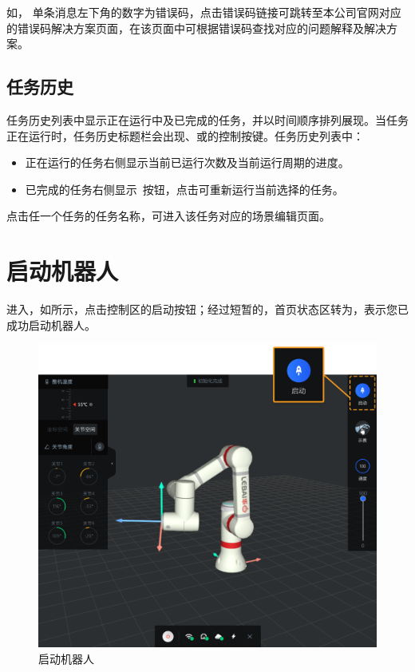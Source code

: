 如，
单条消息左下角的数字为错误码，点击错误码链接可跳转至本公司官网对应的错误码解决方案页面，在该页面中可根据错误码查找对应的问题解释及解决方案。

\subsection{任务历史}
\label{sec:任务历史}
任务历史列表中显示正在运行中及已完成的任务，并以时间顺序排列展现。当任务正在运行时，任务历史标题栏会出现、或的控制按键。任务历史列表中：
\begin{itemize}
	\item 正在运行的任务右侧显示当前已运行次数及当前运行周期的进度。
	\item 已完成的任务右侧显示~按钮，点击可重新运行当前选择的任务。
\end{itemize}

点击任一个任务的任务名称，可进入该任务对应的场景编辑页面。


\clearpage

\section{启动机器人}
进入\LM ，如所示，点击控制区的启动按钮；经过短暂的，首页状态区转为，表示您已成功启动机器人。

\begin{figure}[ht]
	\centering
	\includegraphics[width=\textwidth]{screen/2-16.png}
	\caption{启动机器人}
	\label{fig:启动机器人}
\end{figure}

